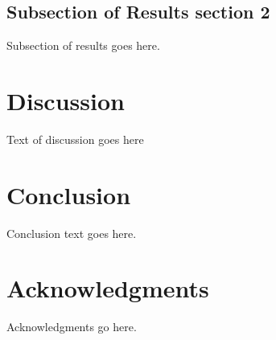 \documentclass[11pt,a4paper]{article}
\begin{document}
\subsection*{Subsection of Results section 2}
Subsection of results goes here.
\lipsum[21]

\section*{Discussion}

Text of discussion goes here


\section*{Conclusion}

Conclusion text goes here.
\lipsum[5]


\section*{Acknowledgments}

Acknowledgments go here.

\newpage


\end{document}
